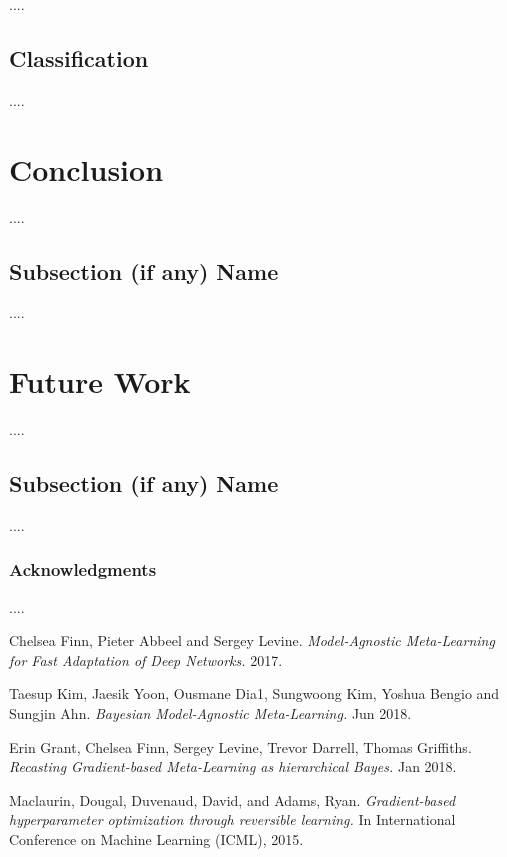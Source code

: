 \documentclass[a4paper]{article}
\begin{document}
\pagebreak
....

\subsection*{Classification}

....

\section*{Conclusion}

....

\subsection*{Subsection (if any) Name}

....

\section*{Future Work}

....

\subsection*{Subsection (if any) Name}

....

\subsubsection*{Acknowledgments}

....
\pagebreak
\begin{thebibliography}{9}
Chelsea Finn, Pieter Abbeel and Sergey Levine.
\textit{Model-Agnostic Meta-Learning for Fast Adaptation of Deep Networks.}
2017.

Taesup Kim, Jaesik Yoon, Ousmane Dia1, Sungwoong Kim, Yoshua Bengio and Sungjin Ahn.
\textit{Bayesian Model-Agnostic Meta-Learning.}
Jun 2018.

Erin Grant, Chelsea Finn, Sergey Levine, Trevor Darrell, Thomas Griffiths.
\textit{Recasting Gradient-based Meta-Learning as hierarchical Bayes.}
Jan 2018.

Maclaurin, Dougal, Duvenaud, David, and Adams, Ryan.
\textit{Gradient-based hyperparameter optimization through reversible learning.}
In International Conference on Machine Learning (ICML), 2015.
\end{thebibliography}
\end{document}
